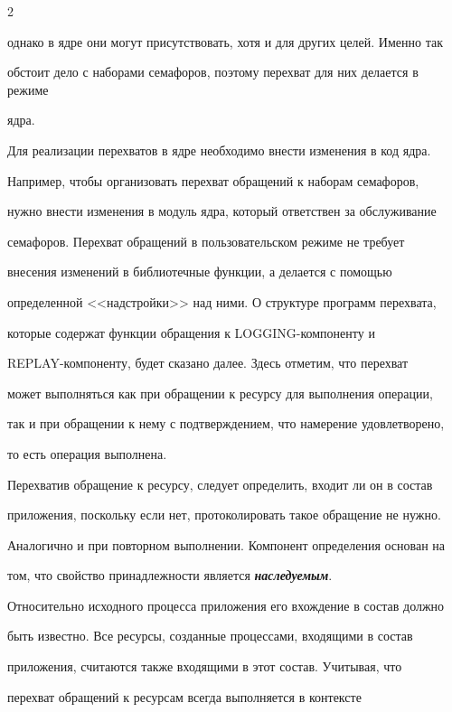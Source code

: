 \begin{multicols}{2}
\begin{enumerate}[(1)]
однако в ядре они могут присутствовать, хотя и для других целей. Именно так 

обстоит дело с наборами семафоров, поэтому перехват для них делается в режиме 

ядра. 

{%



}

\end{enumerate}



Для реализации перехватов в ядре необходимо внести изменения в код ядра.

Например, чтобы организовать перехват обращений к наборам семафоров,

нужно внести изменения в модуль ядра, который ответствен за обслуживание

семафоров. Перехват обращений в пользовательском режиме не требует

внесения изменений в библиотечные функции, а делается с помощью

определенной <<надстройки>> над ними. О структуре программ перехвата,

которые содержат функции обращения к LOGGING-компоненту и

REPLAY-компоненту, будет сказано далее. Здесь отметим, что перехват

может выполняться как при обращении к ресурсу для выполнения операции,

так  и при обращении к нему с подтверждением, что намерение удовлетворено,

то есть операция выполнена.



Перехватив обращение к ресурсу, следует определить, входит ли он в состав

приложения, поскольку если нет, протоколировать такое обращение не нужно.

Аналогично и при повторном выполнении. Компонент определения основан на

том, что свойство принадлежности является {\bfseries\textit{на\-сле\-ду\-емым}}.

Относительно исходного процесса приложения его вхождение в состав должно

быть известно. Все ресурсы, созданные процессами, входящими в состав

приложения, считаются также входящими в этот состав. Учитывая, что

перехват обращений к ресурсам всегда выполняется в контексте


\end{multicols}
